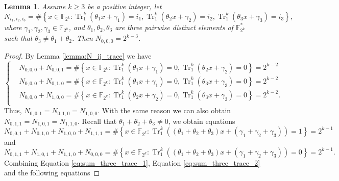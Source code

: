 \documentclass{article}
\newcommand{\F}{\mathbb{F}}
\newcommand{\0}{\textbf{0}}
\newcommand{\1}{\textbf{1}}
\newcommand{\TRACE}{\operatorname{Tr}_1^k}
\theoremstyle{plain}
\newtheorem{lemma}{Lemma}
\begin{document}
    \begin{lemma}\label{lemma:N_ijk_trace}
        Assume $k\ge 3$ be a positive integer, let
        \[ N_{i_1,i_2,i_3}=\#\left\{x\in\F_{2^k} :  \TRACE\left(\theta_1x+\gamma_1\right)=i_1,\TRACE\left(\theta_2x+\gamma_2\right)=i_2,\TRACE\left(\theta_3x+\gamma_3\right)=i_3 \right\},\]
        where  $\gamma_1,\gamma_2,\gamma_3\in\F_{2^k}$, and $\theta_1,\theta_2,\theta_3$ are three pairwise distinct elements of $\F_{2^k}^*$ such that $\theta_3\ne\theta_1+\theta_2$. Then $N_{0,0,0}= 2^{k-3}$.
    \end{lemma}

    \begin{proof}
        By Lemma \ref{lemma:N_ij_trace} we have
        \begin{equation}\label{eq:from_lemma_1}\left\{\begin{alignedat}{3}
        &N_{0,0,0}+N_{0,0,1}=\#\left\{x\in\F_{2^k} : \TRACE\left(\theta_1x+\gamma_1\right)=0, \TRACE\left(\theta_2x+\gamma_2\right)=0\right\}=2^{k-2}\\
        &N_{0,0,0}+N_{0,1,0}=\#\left\{x\in\F_{2^k} : \TRACE\left(\theta_1x+\gamma_1\right)=0, \TRACE\left(\theta_3x+\gamma_3\right)=0\right\}=2^{k-2}\\
        &N_{0,0,0}+N_{1,0,0}=\#\left\{x\in\F_{2^k} : \TRACE\left(\theta_2x+\gamma_2\right)=0, \TRACE\left(\theta_3x+\gamma_3\right)=0\right\}=2^{k-2}.\\
        \end{alignedat}\right.\end{equation}
        Thus, $N_{0,0,1}=N_{0,1,0}=N_{1,0,0}$. With the same reason we can also obtain  $N_{0,1,1}=N_{1,0,1}=N_{1,1,0}$.
        Recall that $\theta_1+\theta_2+\theta_3\ne 0$, we obtain equations
        \begin{equation}\label{eq:sum_three_trace_1}
            N_{0,0,1}+N_{0,1,0}+N_{1,0,0}+N_{1,1,1}=\#\left\{x\in\F_{2^k} : \TRACE\left(\left(\theta_1+\theta_2+\theta_3\right)x+\left(\gamma_1+\gamma_2+\gamma_3\right)\right)=1\right\}=2^{k-1}
        \end{equation}
        and
        \begin{equation}\label{eq:sum_three_trace_2}
            N_{0,1,1}+N_{1,0,1}+N_{1,1,0}+N_{0,0,0}=\#\left\{x\in\F_{2^k} : \TRACE\left(\left(\theta_1+\theta_2+\theta_3\right)x+\left(\gamma_1+\gamma_2+\gamma_3\right)\right)=0\right\}=2^{k-1}.
        \end{equation}
        Combining Equation \eqref{eq:sum_three_trace_1}, Equation \eqref{eq:sum_three_trace_2} and the following equations

\end{proof}
\end{document}
